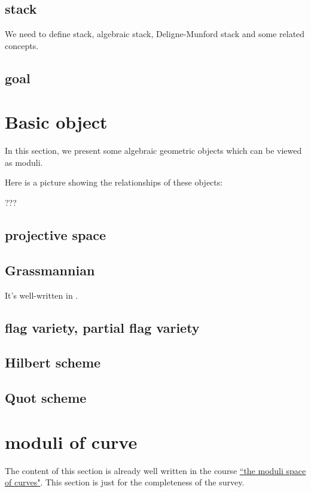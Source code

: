\documentclass[reqno,11pt]{amsart}
\numberwithin{equation}{section}
\theoremstyle{plain}
\theoremstyle{plain}
\numberwithin{equation}{section}
\theoremstyle{remark}
\begin{document}
\subsection{stack}
We need to define stack, algebraic stack, Deligne-Munford stack and some related concepts.
\subsection{goal}
\section{Basic object}
In this section, we present some algebraic geometric objects which can be viewed as moduli.

Here is a picture showing the relationships of these objects:

???
\subsection{projective space}
\subsection{Grassmannian}
It's well-written in \cite[16.7]{FOAG}.
\subsection{flag variety, partial flag variety}
\subsection{Hilbert scheme}
\subsection{Quot scheme}

\section{moduli of curve}
The content of this section is already well written in the course \href{https://johannesschmitt.gitlab.io/moduli_of_curves}{``the moduli space of curves"}. This section is just for the completeness of the survey.

\end{document}
